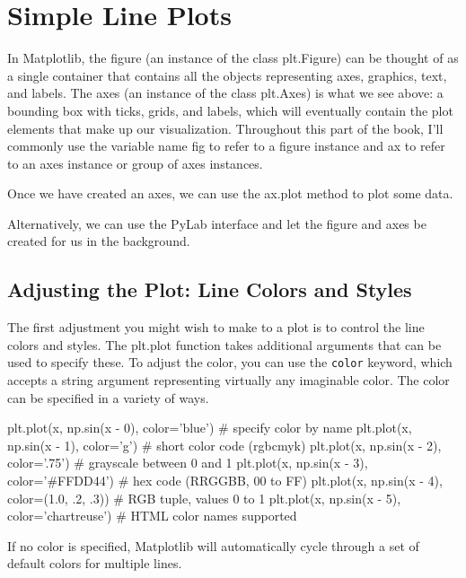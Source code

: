\chapter{Simple Line Plots\label{Ch26}}

\begin{tcolorbox}
    In Matplotlib, the figure (an instance of the class plt.Figure) can be thought of as a
    single container that contains all the objects representing axes, graphics, text, and
    labels. The axes (an instance of the class plt.Axes) is what we see above: a bounding
    box with ticks, grids, and labels, which will eventually contain the plot elements that
    make up our visualization. Throughout this part of the book, I'll commonly use the
    variable name fig to refer to a figure instance and ax to refer to an axes instance or
    group of axes instances.
\end{tcolorbox}

Once we have created an axes, we can use the ax.plot method to plot some data.

Alternatively, we can use the PyLab interface and let the figure and axes be created for
us in the background.
\section{Adjusting the Plot: Line Colors and Styles}
The first adjustment you might wish to make to a plot is to control the line colors and
styles. The plt.plot function takes additional arguments that can be used to specify
these. To adjust the color, you can use the \verb|color| keyword, which accepts a string
argument representing virtually any imaginable color. The color can be specified in a
variety of ways.

\begin{pyc}
    plt.plot(x, np.sin(x - 0), color='blue')        # specify color by name
    plt.plot(x, np.sin(x - 1), color='g')           # short color code (rgbcmyk)
    plt.plot(x, np.sin(x - 2), color='.75')         # grayscale between 0 and 1
    plt.plot(x, np.sin(x - 3), color='#FFDD44')     # hex code (RRGGBB, 00 to FF)
    plt.plot(x, np.sin(x - 4), color=(1.0, .2, .3)) # RGB tuple, values 0 to 1
    plt.plot(x, np.sin(x - 5), color='chartreuse')  # HTML color names supported
\end{pyc}

If no color is specified, Matplotlib will automatically cycle through a set of default
colors for multiple lines.

